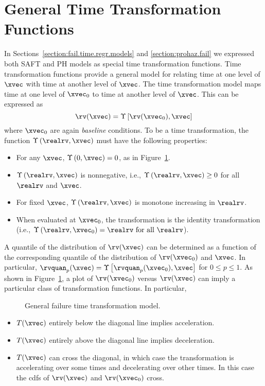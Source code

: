\section{General Time Transformation Functions}
\label{section:gen.time.trans}
In Sections~\ref{section:fail.time.regr.models} and
\ref{section:prohaz.fail} we expressed both SAFT and PH models as
special time transformation functions. Time transformation functions
provide a general model for relating time at one level of $\xvec$
with time at another level of $\xvec$. The time transformation model
maps time at one level of $\xvec_{0}$ to time at another level of
$\xvec$. This can be expressed as
\begin{displaymath}
\rv(\xvec)=\Upsilon \left [\rv(\xvec_{0}),\xvec \right ]
\end{displaymath}
where $\xvec_{0}$ are again {\em baseline} conditions. To be a time
transformation, the function $\Upsilon \left (\realrv,\xvec \right )$
must have the following properties:
\begin{itemize}
\item
For any $\xvec$, $\Upsilon \left (0,\xvec \right )=0$, as in 
Figure~\ref{figure:general.transform.ps}.
\item
$\Upsilon \left (\realrv,\xvec \right ) $ is nonnegative, i.e.,
$\Upsilon \left (\realrv,\xvec \right ) \ge 0$ for all $\realrv$ and
$\xvec$.
\item
For fixed $\xvec$, $\Upsilon \left (\realrv,\xvec \right )$ is
monotone increasing in $\realrv$.
\item
When evaluated at $\xvec_{0}$, the transformation is the identity 
transformation (i.e., $\Upsilon \left (\realrv,\xvec_{0} \right )=\realrv
\,\, \mbox{for all} \,\, \realrv $). 
\end{itemize}
A quantile of the distribution of $\rv(\xvec)$ can be determined as a
function of the corresponding quantile of the distribution of
$\rv(\xvec_{0})$ and $\xvec$.  In particular, $\rvquan_{p}(\xvec)=
\Upsilon \left [\rvquan_{p}(\xvec_{0}),\xvec \right ]
$ for $0 \le p \le 1.$ As shown in
Figure~\ref{figure:general.transform.ps}, a plot of
$\rv(\xvec_{0})$ versus $\rv(\xvec)$ can imply a particular class of
transformation functions. In particular,
\begin{figure}
\caption{General failure time transformation  model.}
\label{figure:general.transform.ps}
\end{figure}
\begin{itemize} 
\item
$T(\xvec)$ entirely below the diagonal line implies acceleration.
\item
$T(\xvec)$ entirely above the diagonal line implies deceleration.
\item
$T(\xvec)$ can cross the diagonal, in which case the transformation is
accelerating over some times and decelerating over other times. In
this case the cdfs of $\rv(\xvec)$ and $\rv(\xvec_{0})$ cross.
\end{itemize}

